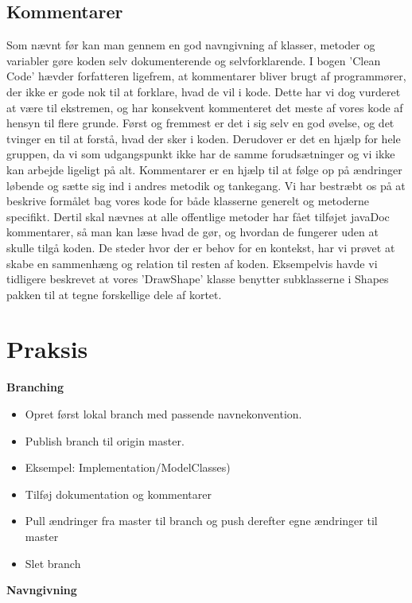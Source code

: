 \documentclass{article}
\begin{document}
\subsection{Kommentarer}
Som nævnt før kan man gennem en god navngivning af klasser, metoder og variabler gøre koden selv­ dokumenterende og selvforklarende. I bogen ’Clean Code’ hævder forfatteren ligefrem, at kommentarer bliver brugt af programmører, der ikke er gode nok til at forklare, hvad de vil i kode. Dette har vi dog vurderet at være til ekstremen, og har konsekvent kommenteret det meste af vores kode af hensyn til flere grunde. Først og fremmest er det i sig selv en god øvelse, og det tvinger en til at forstå, hvad der sker i koden. Derudover er det en hjælp for hele gruppen, da vi som udgangspunkt ikke har de samme forudsætninger og vi ikke kan arbejde ligeligt på alt. Kommentarer er en hjælp til at følge op på ændringer løbende og sætte sig ind i andres metodik og tankegang.
Vi har bestræbt os på at beskrive formålet bag vores kode for både klasserne generelt og metoderne specifikt. Dertil skal nævnes at alle offentlige metoder har fået tilføjet javaDoc kommentarer, så man kan læse hvad de gør, og hvordan de fungerer uden at skulle tilgå koden. De steder hvor der er behov for en kontekst, har vi prøvet at skabe en sammenhæng og relation til resten af koden. Eksempelvis havde vi tidligere beskrevet at vores ’DrawShape’ klasse benytter subklasserne i Shapes pakken til at tegne forskellige dele af kortet.

\section{Praksis}

\textbf{Branching}

\begin{itemize}
 	\item Opret først lokal branch med passende navnekonvention.
 	\item Publish branch til origin master. 
 	\item Eksempel: Implementation/ModelClasses)
	\item Tilføj dokumentation og kommentarer
	\item Pull ændringer fra master til branch og push derefter egne ændringer til master 
	\item Slet branch
\end{itemize}

\textbf{Navngivning}
\end{document}

